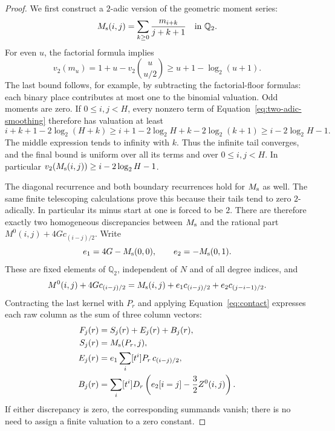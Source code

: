 \begin{proof}
We first construct a $2$-adic version of the geometric moment series:
\begin{equation}\label{eq:two-adic-smoothing}
M_{\rm s}(i,j)=\sum_{k\ge0}\frac{m_{i+k}}{j+k+1}\quad\text{in }\mathbb Q_2.
\end{equation}
For even $u$, the factorial formula implies
\[
v_2(m_u)=1+u-v_2\binom{u}{u/2}
\ge u+1-\log_2(u+1).
\]
The last bound follows, for example, by subtracting the factorial-floor
formulas: each binary place contributes at most one to the binomial
valuation. Odd moments are zero. If $0\le i,j<H$, every nonzero term
of Equation~\eqref{eq:two-adic-smoothing} therefore has valuation at least
\begin{equation}\label{eq:smoothing-tail-bound}
i+k+1-2\log_2(H+k)
\ge i+1-2\log_2 H+k-2\log_2(k+1)
\ge i-2\log_2 H-1.
\end{equation}
The middle expression tends to infinity with $k$. Thus the infinite
tail converges, and the final bound is uniform over all its terms and
over $0\le i,j<H$. In particular
$v_2(M_{\rm s}(i,j))\ge i-2\log_2H-1$.

The diagonal recurrence and both boundary recurrences hold for
$M_{\rm s}$ as well. The same finite telescoping calculations prove
this because their tails tend to zero $2$-adically. In particular its
minus start at one is forced to be $2$. There are therefore exactly
two homogeneous discrepancies between $M_{\rm s}$ and the rational
part $M^0(i,j)+4G c_{(i-j)/2}$. Write
\begin{equation}\label{eq:two-adic-discrepancies}
e_1=4G-M_{\rm s}(0,0),\qquad e_2=-M_{\rm s}(0,1).
\end{equation}
These are fixed elements of $\mathbb Q_2$, independent of $N$ and of
all degree indices, and
\[
M^0(i,j)+4G c_{(i-j)/2}
=M_{\rm s}(i,j)+e_1c_{(i-j)/2}+e_2c_{(j-i-1)/2}.
\]
Contracting the last kernel with $P_r$ and applying
Equation~\eqref{eq:contact} expresses each raw column as the sum of
three column vectors:
\begin{equation}\label{eq:two-adic-column-types}
\begin{split}
F_j(r)&=S_j(r)+E_j(r)+B_j(r),\\
S_j(r)&=M_{\rm s}(P_r,j),\\
E_j(r)&=e_1\sum_i[t^i]P_r\,c_{(i-j)/2},\\
B_j(r)&=\sum_i[t^i]D_r\left(e_2[i=j]-\frac32Z^0(i,j)\right).
\end{split}
\end{equation}
If either discrepancy is zero, the corresponding summands vanish;
there is no need to assign a finite valuation to a zero constant.


\end{proof}
